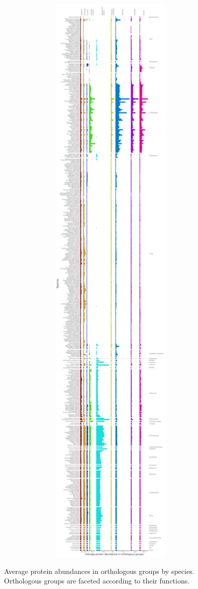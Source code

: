 \begin{figure}[p]

\caption{Average protein abundances in orthologous groups by species. Orthologous groups are faceted according to their functions.}\label{fig:uncapped_abundances}

{\centering \includegraphics[height=35in, width=7in]{figs/analysis.abundance.uncapped_abundances-1} }

\end{figure}

